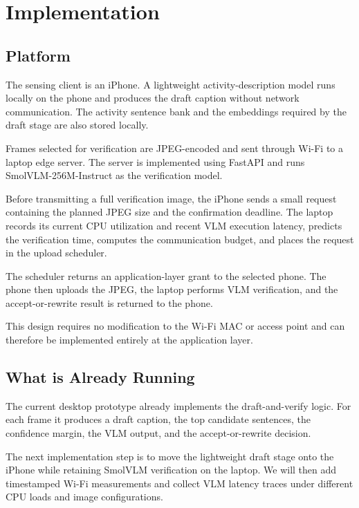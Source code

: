 \section{Implementation}

\subsection{Platform}

The sensing client is an iPhone. A lightweight activity-description model
runs locally on the phone and produces the draft caption without network
communication. The activity sentence bank and the embeddings required by the
draft stage are also stored locally.

Frames selected for verification are JPEG-encoded and sent through Wi-Fi to
a laptop edge server. The server is implemented using FastAPI and runs
SmolVLM-256M-Instruct as the verification model.

Before transmitting a full verification image, the iPhone sends a small
request containing the planned JPEG size and the confirmation deadline. The
laptop records its current CPU utilization and recent VLM execution latency,
predicts the verification time, computes the communication budget, and places
the request in the upload scheduler.

The scheduler returns an application-layer grant to the selected phone. The
phone then uploads the JPEG, the laptop performs VLM verification, and the
accept-or-rewrite result is returned to the phone.

This design requires no modification to the Wi-Fi MAC or access point and can
therefore be implemented entirely at the application layer.

\subsection{What is Already Running}

The current desktop prototype already implements the draft-and-verify logic.
For each frame it produces a draft caption, the top candidate sentences, the
confidence margin, the VLM output, and the accept-or-rewrite decision.

The next implementation step is to move the lightweight draft stage onto the
iPhone while retaining SmolVLM verification on the laptop. We will then add
timestamped Wi-Fi measurements and collect VLM latency traces under different
CPU loads and image configurations.

